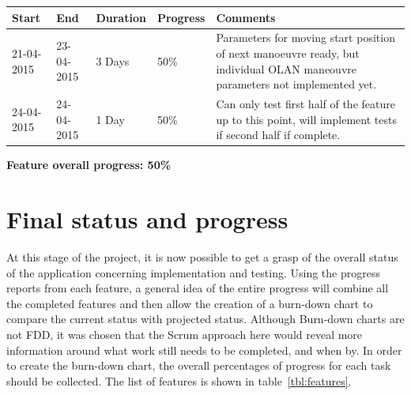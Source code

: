 \begin{table}[h]
\begin{tabular}{|l|l|l|l|p{7cm}|}
\hline
\textbf{Start} & \textbf{End} & \textbf{Duration} & \textbf{Progress} & \textbf{Comments}                                                                                                     \\ \hline
21-04-2015     & 23-04-2015   & 3 Days            & 50\%             &  Parameters for moving start position of next manoeuvre ready, but individual OLAN maneouvre parameters not implemented yet.\\ \hline
24-04-2015     & 24-04-2015   & 1 Day            & 50\%             &  Can only test first half of the feature up to this point, will implement tests if second half if complete.\\ \hline
\end{tabular}
\end{table}

\textbf{Feature overall progress: 50\%}

\clearpage

\section{Final status and progress}
At this stage of the project, it is now possible to get a grasp of the overall status of the application concerning implementation and testing. Using the progress reports from each feature, a general idea of the entire progress will combine all the completed features and then allow the creation of a burn-down chart to compare the current status with projected status. Although Burn-down charts are not FDD, it was chosen that the Scrum approach here would reveal more information around what work still needs to be completed, and when by. In order to create the burn-down chart, the overall percentages of progress for each task should be collected. The list of features is shown in table~\ref{tbl:features}.

